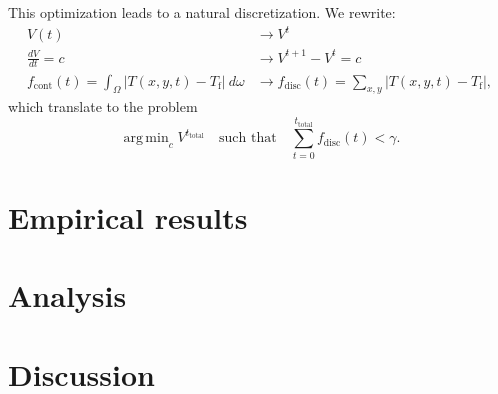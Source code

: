 \documentclass[12pt]{article}
\newcommand{\abs}[1]{\left|#1\right|}
\DeclareMathOperator*{\argmin}{\mathrm{arg\,min}}
\begin{document}
This optimization leads to a natural discretization. We rewrite:
\begin{align}
    V(t) &\longrightarrow V^t \\
    \frac{dV}{dt} = c &\longrightarrow V^{t+1} - V^t = c \\
    f_{\mathrm{cont}}(t) = \int_{\Omega} \abs{T(x,y,t) - T_{\mathrm{f}}} \
    d\omega &\longrightarrow f_{\mathrm{disc}}(t) = \sum_{x,y}\abs{T(x,y,t) -
        T_{\mathrm{f}}},
\end{align}
which translate to the problem
\begin{equation}
    \argmin_{c} V^{t_{\mathrm{total}}} \quad \text{such that} \quad
    \sum_{t=0}^{t_{\mathrm{total}}} f_{\mathrm{disc}}(t) < \gamma.
    \label{eq:\theequation}
\end{equation}

\section{Empirical results}

\section{Analysis}

\section{Discussion}

\nocite{air}

\printbibliography
\end{document}
